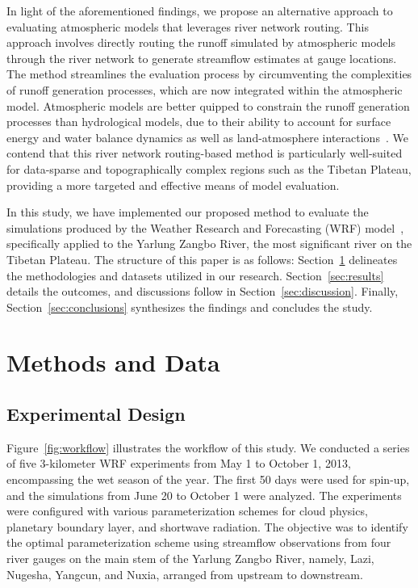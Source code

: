 \documentclass[draft]{agujournal2019}
\begin{document}
In light of the aforementioned findings, we propose an alternative approach to evaluating atmospheric models that leverages river network routing. This approach involves directly routing the runoff simulated by atmospheric models through the river network to generate streamflow estimates at gauge locations. The method streamlines the evaluation process by circumventing the complexities of runoff generation processes, which are now integrated within the atmospheric model. Atmospheric models are better quipped to constrain the runoff generation processes than hydrological models, due to their ability to account for surface energy and water balance dynamics as well as land-atmosphere interactions~\cite{wagner2016WRR, senatore2015JAMES}. We contend that this river network routing-based method is particularly well-suited for data-sparse and topographically complex regions such as the Tibetan Plateau, providing a more targeted and effective means of model evaluation.

In this study, we have implemented our proposed method to evaluate the simulations produced by the Weather Research and Forecasting (WRF) model~\cite{powers2017BAMS}, specifically applied to the Yarlung Zangbo River, the most significant river on the Tibetan Plateau. The structure of this paper is as follows: Section~\ref{sec:methods} delineates the methodologies and datasets utilized in our research. Section~\ref{sec:results} details the outcomes, and discussions follow in Section~\ref{sec:discussion}. Finally, Section~\ref{sec:conclusions} synthesizes the findings and concludes the study.

\section{Methods and Data}\label{sec:methods}

\subsection{Experimental Design}

Figure~\ref{fig:workflow} illustrates the workflow of this study. We conducted a series of five 3-kilometer WRF experiments from May 1 to October 1, 2013, encompassing the wet season of the year. The first 50 days were used for spin-up, and the simulations from June 20 to October 1 were analyzed. The experiments were configured with various parameterization schemes for cloud physics, planetary boundary layer, and shortwave radiation. The objective was to identify the optimal parameterization scheme using streamflow observations from four river gauges on the main stem of the Yarlung Zangbo River, namely, Lazi, Nugesha, Yangcun, and Nuxia, arranged from upstream to downstream.
\end{document}
